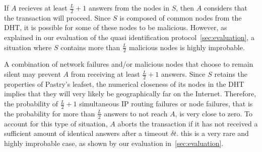 If $A$ recieves at least $\frac{L}{2} + 1$ answers from the nodes in $S$, then
$A$ considers that the transaction will proceed. Since $S$ is composed of
common nodes from the DHT, it is possible for some of these nodes to be
malicious. However, as explained in our evaluation of the quasi identification
protocol~\ref{sec:evaluation}, a situation where $S$ contains more than
$\frac{L}{2}$ malicious nodes is highly improbable.

A combination of network failures and/or malicious nodes that choose to remain
silent may prevent $A$ from receiving at least $\frac{L}{2} + 1$ answers. Since
$S$ retains the properties of Pastry's leafset, the numerical closeness of its
nodes in the DHT implies that they will very likely be geographically far on
the Internet. Therefore, the probability of $\frac{L}{2} + 1 $ simultaneous IP
routing failures or node failures, that is the probability for more than
$\frac{L}{2}$ answers to not reach $A$, is very close to zero. To account for
this type of situation, $A$ aborts the transaction if it has not received a
sufficient amount of identical answers after a timeout $\delta t$. this is a
very rare and highly improbable case, as shown by our evaluation
in~\ref{sec:evaluation}.



